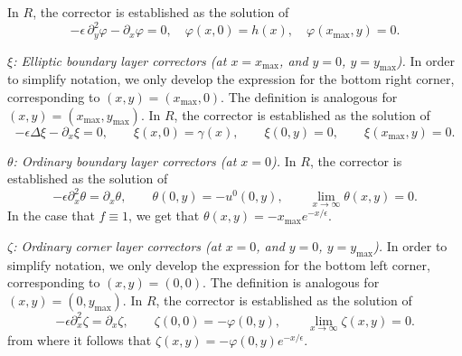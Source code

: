 \documentclass{article}
\newcommand{\est}{\text{\,e.s.t.}\xspace}
\newcommand{\R}{\ensuremath{\mathbb{R}}\xspace}
\begin{document}
\begin{appendix}
In $R$, the corrector is established as the solution of
\begin{equation*}
    -\epsilon\,\partial_{y}^2\varphi-\partial_x\varphi = 0, \quad
    \varphi(x,0)=h(x), \quad 
    \varphi(x_{\max},y)=0.
\end{equation*}

\medskip 
\textit{$\xi$: Elliptic boundary layer correctors (at $x=x_{\max}$, and $y=0$, $y=y_{\max}$).}
In order to simplify notation, we only develop the expression for the bottom right corner, corresponding to $(x,y)=(x_{\max},0)$. The definition is analogous for $(x,y)=(x_{\max},y_{\max})$.
In $R$, the corrector is established as the solution of
\begin{equation*}
    -\epsilon\Delta \xi -\partial_x\xi = 0, \qquad
    \xi(x,0)=\gamma(x), \qquad 
    \xi(0,y)=0,\qquad 
    \xi(x_{\max},y)=0.
\end{equation*}

\medskip 
\textit{$\theta$: Ordinary boundary layer correctors (at $x=0$).}
In $R$, the corrector is established as the solution of
\begin{equation}\label{def:theta}
    -\epsilon\partial_x^2\theta = \partial_x\theta, \qquad
    \theta(0,y)=-u^0(0,y), \qquad 
    \lim_{x \to \infty} \theta(x,y) = 0.
\end{equation}
In the case that $f\equiv 1$, we get that $\theta(x,y) = -x_{\max}e^{-x/\epsilon}.$ 

\medskip 
\textit{$\zeta$: Ordinary corner layer correctors (at $x=0$, and $y=0$, $y=y_{\max}$).}
In order to simplify notation, we only develop the expression for the bottom left corner, corresponding to $(x,y)=(0,0)$. The definition is analogous for $(x,y)=(0,y_{\max})$.
In $R$, the corrector is established as the solution of
\begin{equation*}
    -\epsilon\partial_x^2\zeta = \partial_x\zeta, \qquad
    \zeta(0,0)=-\varphi(0,y), \qquad 
    \lim_{x \to \infty} \zeta(x,y) = 0.
\end{equation*}
from where it follows that $\zeta(x,y) = -\varphi(0,y)e^{-x/\epsilon}.$


\end{appendix}
\end{document}

